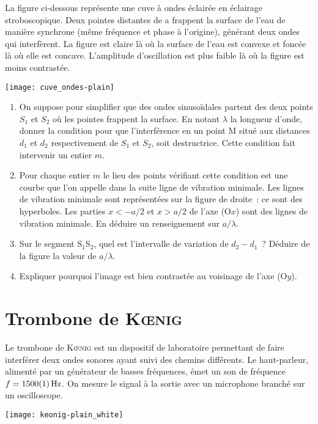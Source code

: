 \documentclass[a4paper, 12pt, final, garamond]{book}
\begin{document}
La figure ci-dessous représente une cuve à ondes éclairée en éclairage
stroboscopique. Deux pointes distantes de a frappent la surface de l'eau de
manière synchrone (même fréquence et phase à l'origine), générant deux ondes qui
interfèrent. La figure est claire là où la surface de l'eau est convexe et
foncée là où elle est concave. L'amplitude d'oscillation est plus faible là où
la figure est moins contrastée.

\begin{center}
    \texttt{[image: cuve\_ondes-plain]}
\end{center}

\begin{enumerate}
    \item On suppose pour simplifier que des ondes sinusoïdales partent des deux
        points $S_1$ et $S_2$ où les pointes frappent la surface. En notant
        $\lambda$ la longueur d'onde, donner la condition pour que
        l'interférence en un point M situé aux distances $d_1$ et $d_2$
        respectivement de $S_1$ et $S_2$, soit destructrice. Cette condition
        fait intervenir un entier $m$.

    \item Pour chaque entier $m$ le lieu des points vérifiant cette condition
        est une courbe que l'on appelle dans la suite ligne de vibration
        minimale. Les lignes de vibration minimale sont représentées sur la
        figure de droite~: ce sont des hyperboles. Les parties $x < -a/2$ et $x
        > a/2$ de l'axe (O$x$) sont des lignes de vibration minimale. En déduire
        un renseignement sur $a/\lambda$.

    \item Sur le segment S$_1$S$_2$, quel est l'intervalle de variation de $d_2
        - d_1$~? Déduire de la figure la valeur de $a/\lambda$.
    \item Expliquer pourquoi l'image est bien contrastée au voisinage de l'axe
        (O$y$).
\end{enumerate}

\section{Trombone de \textsc{Kœnig}}

\begin{minipage}{0.70\linewidth}
    Le trombone de \textsc{Kœnig} est un dispositif de laboratoire permettant de
    faire interférer deux ondes sonores ayant suivi des chemins différents. Le
    haut-parleur, alimenté par un générateur de basses fréquences, émet un son
    de fréquence $f = \SI{1500\pm1}{Hz}$. On mesure le signal à la sortie avec
    un microphone branché sur un oscilloscope.
\end{minipage}
\hfill
\begin{minipage}{0.30\linewidth}
    \begin{center}
        \texttt{[image: keonig-plain\_white]}
    \end{center}
\end{minipage}
\end{document}
